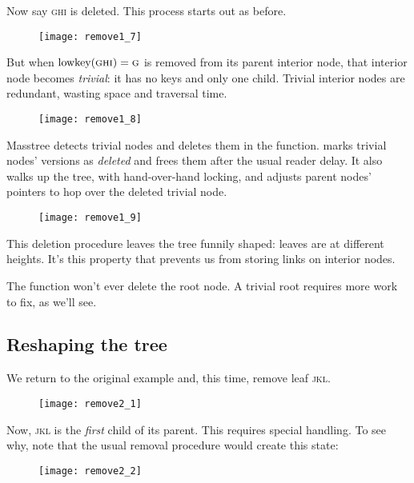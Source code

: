 \documentclass[11pt]{article}
\newcommand{\V}[1]{\textit{#1}}
\newcommand{\N}[1]{\text{\upshape{#1}}}
\newcommand{\ITEM}[1]{\textsc{#1}}
\begin{document}
Now say \ITEM{ghi} is deleted. This process starts out as before.

\begin{figure}[H]
\texttt{[image: remove1\_7]}
\end{figure}

\noindent%
But when \(\N{lowkey}(\ITEM{ghi}) = \ITEM{g}\) is removed from its
parent interior node, that interior node becomes \emph{trivial}: it has
no keys and only one child. Trivial interior nodes are redundant,
wasting space and traversal time.

\begin{figure}[H]
\texttt{[image: remove1\_8]}
\end{figure}

Masstree detects trivial nodes and deletes them in the \N{collapse}
function. \N{Collapse} marks trivial nodes' versions as \V{deleted} and
frees them after the usual reader delay. It also walks up the tree, with
hand-over-hand locking, and adjusts parent nodes' pointers to hop over
the deleted trivial node.

\begin{figure}[H]
\texttt{[image: remove1\_9]}
\end{figure}

\noindent%
This deletion procedure leaves the tree funnily shaped: leaves are at
different heights. It's this property that prevents us from storing
links on interior nodes.

The \N{collapse} function won't ever delete the root node. A trivial
root requires more work to fix, as we'll see.

\subsection{Reshaping the tree}

We return to the original example and, this time, remove leaf \ITEM{jkl}.

\begin{figure}[H]
\texttt{[image: remove2\_1]}
\end{figure}

Now, \ITEM{jkl} is the \emph{first} child of its parent. This requires
special handling. To see why, note that
the usual removal procedure would create this state:

\begin{figure}[H]
\texttt{[image: remove2\_2]}
\end{figure}
\end{document}
